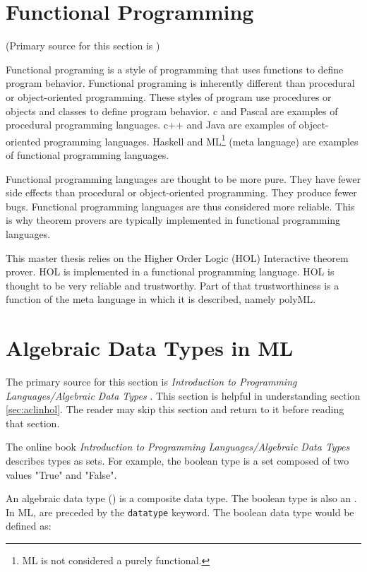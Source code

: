 \documentclass[../../main/main.tex]{subfiles}
\begin{document}
\section{Functional Programming}
(Primary source for this section is \cite{functionalprogramming})

Functional programing is a style of programming that uses functions to define program behavior.  Functional programing is inherently different than procedural or object-oriented programming. These styles of program use procedures or objects and classes to define program behavior.  c  and Pascal are examples of procedural programming languages.  c++ and Java are examples of object-oriented programming languages.  Haskell and ML\footnote{ML is not considered a purely functional.} (meta language) are examples of functional programming languages.  

Functional programming languages are thought to be more pure.  They have fewer side effects than procedural or object-oriented programming.  They produce fewer bugs.  Functional programming languages are thus considered more reliable. This is why theorem provers are typically implemented in functional programming languages.  

This master thesis relies on the Higher Order Logic (HOL) Interactive theorem prover.  HOL is implemented in a functional programming language.  HOL is thought to be very reliable and trustworthy.  Part of that trustworthiness is a function of the meta language in which it is described, namely polyML.

\section{Algebraic Data Types in ML}\label{adt}
The primary source for this section is \textit{Introduction to Programming Languages/Algebraic  Data Types} \cite{types}.  This section is helpful in understanding section \ref{sec:aclinhol}.  The reader may skip this section and return to it before reading that section.

The online book \textit{Introduction to Programming Languages/Algebraic  Data Types} describes types as sets.  For example, the boolean type is a set composed of two values "True" and "False".  

An algebraic data type () is a composite data type.  The boolean type is also an .  In ML,  are preceded by the \texttt{datatype} keyword.  The boolean data type would be defined as:
\end{document}
